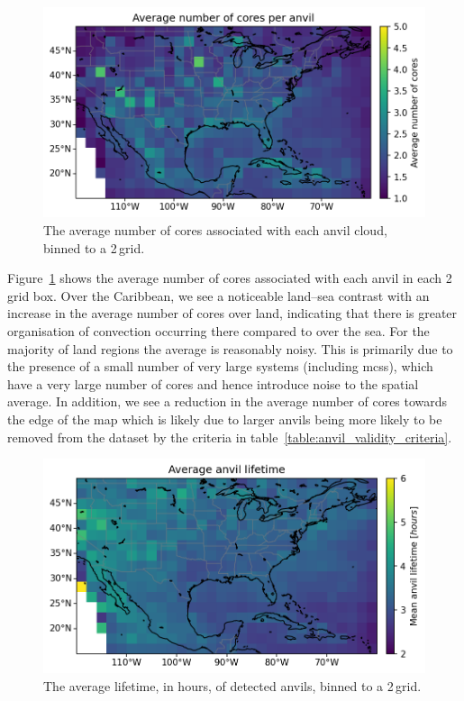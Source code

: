 \begin{figure}[tp]
    \centering
    \includegraphics[width=\textwidth]{figures/ch2_13.png}
    \caption[
    The average number of cores associated with each anvil cloud
    ]{
    The average number of cores associated with each anvil cloud, binned to a 2\,\textdegree grid.
    }
    \label{fig:anvil_number_of_cores_map}
\end{figure}

Figure~\ref{fig:anvil_number_of_cores_map} shows the average number of cores associated with each anvil in each 2\,\textdegree grid box.
Over the Caribbean, we see a noticeable land--sea contrast with an increase in the average number of cores over land, indicating that there is greater organisation of convection occurring there compared to over the sea.
For the majority of land regions the average is reasonably noisy.
This is primarily due to the presence of a small number of very large systems (including \acrshort{mcs}s), which have a very large number of cores and hence introduce noise to the spatial average.
In addition, we see a reduction in the average number of cores towards the edge of the map which is likely due to larger anvils being more likely to be removed from the dataset by the criteria in table~\ref{table:anvil_validity_criteria}.

\begin{figure}[tp]
    \centering
    \includegraphics[width=\textwidth]{figures/ch2_14.png}
    \caption[
    The average lifetime of detected anvils
    ]{
    The average lifetime, in hours, of detected anvils, binned to a 2\,\textdegree grid.
    }
    \label{fig:anvil_lifetime_map}
\end{figure}


